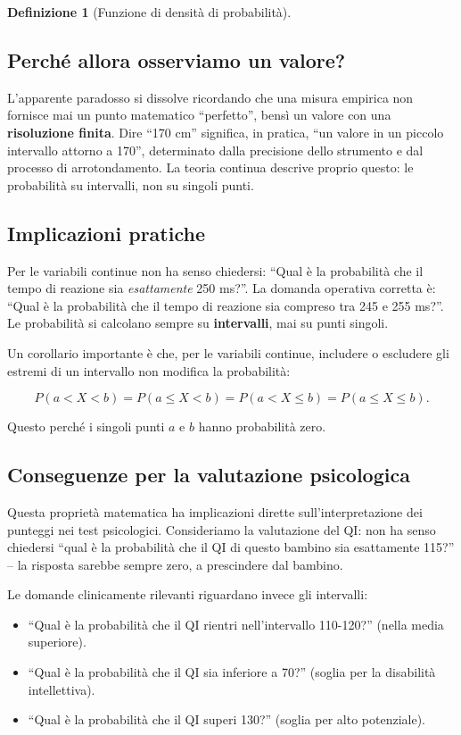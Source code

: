 \documentclass[
  italian,
  letterpaper,
  a4paper,
  11pt,
  open=any]{scrbook}
\providecommand{\tightlist}{%
  \setlength{\itemsep}{0pt}\setlength{\parskip}{0pt}}
\theoremstyle{plain}
\theoremstyle{definition}
\theoremstyle{definition}
\newtheorem{definition}{Definizione}[chapter]
\theoremstyle{remark}
\begin{document}
\begin{definition}[Funzione di densità di
probabilità]
\subsection{Perché allora osserviamo un
valore?}\label{perchuxe9-allora-osserviamo-un-valore}

L'apparente paradosso si dissolve ricordando che una misura empirica non
fornisce mai un punto matematico ``perfetto'', bensì un valore con una
\textbf{risoluzione finita}. Dire ``170 cm'' significa, in pratica, ``un
valore in un piccolo intervallo attorno a 170'', determinato dalla
precisione dello strumento e dal processo di arrotondamento. La teoria
continua descrive proprio questo: le probabilità su intervalli, non su
singoli punti.

\subsection{Implicazioni pratiche}\label{implicazioni-pratiche}

Per le variabili continue non ha senso chiedersi: ``Qual è la
probabilità che il tempo di reazione sia \emph{esattamente} 250 ms?''.
La domanda operativa corretta è: ``Qual è la probabilità che il tempo di
reazione sia compreso tra 245 e 255 ms?''. Le probabilità si calcolano
sempre su \textbf{intervalli}, mai su punti singoli.

Un corollario importante è che, per le variabili continue, includere o
escludere gli estremi di un intervallo non modifica la probabilità:

\[
P(a < X < b) = P(a \leq X < b) = P(a < X \leq b) = P(a \leq X \leq b).
\]

Questo perché i singoli punti \(a\) e \(b\) hanno probabilità zero.

\subsection{Conseguenze per la valutazione
psicologica}\label{conseguenze-per-la-valutazione-psicologica}

Questa proprietà matematica ha implicazioni dirette sull'interpretazione
dei punteggi nei test psicologici. Consideriamo la valutazione del QI:
non ha senso chiedersi ``qual è la probabilità che il QI di questo
bambino sia esattamente 115?'' -- la risposta sarebbe sempre zero, a
prescindere dal bambino.

Le domande clinicamente rilevanti riguardano invece gli intervalli:

\begin{itemize}
\tightlist
\item
  ``Qual è la probabilità che il QI rientri nell'intervallo 110-120?''
  (nella media superiore).
\item
  ``Qual è la probabilità che il QI sia inferiore a 70?'' (soglia per la
  disabilità intellettiva).
\item
  ``Qual è la probabilità che il QI superi 130?'' (soglia per alto
  potenziale).
\end{itemize}


\end{definition}
\end{document}
